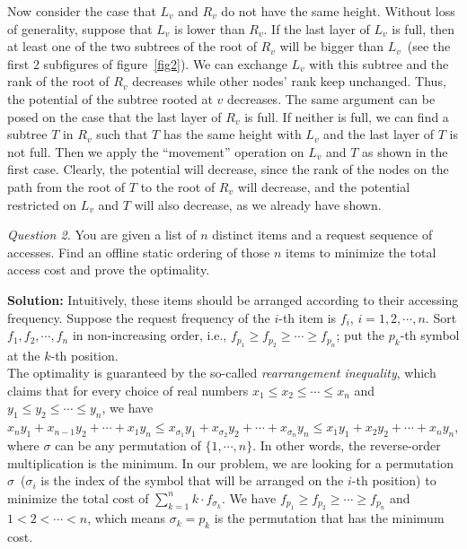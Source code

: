 \documentclass[11pt]{article}
\begin{document}
Now consider the case that $L_v$ and $R_v$ do not have the same height.
Without loss of generality, suppose that $L_v$ is lower than $R_v$.
If the last layer of $L_v$ is full, then 
at least one of the two subtrees of the root of $R_v$ will be 
bigger than $L_v$~(see the first 2 subfigures of figure~\ref{fig2}).
We can exchange $L_v$ with this subtree and the rank of the root of $R_v$ decreases while other nodes' rank keep unchanged.
Thus, the potential of the subtree rooted at $v$ decreases.
The same argument can be posed on the case that the last layer of $R_v$ is full.
If neither is full, we can find a subtree $T$ in $R_v$ such that $T$ has the same height with $L_v$ and
the last layer of $T$ is not full. Then we apply the ``movement'' operation on $L_v$ and $T$ as shown in the first case.
Clearly, the potential will decrease, since the rank of the nodes on the path from the root of $T$ to the root of $R_v$ will decrease, and the potential restricted on $L_v$ and $T$ will also decrease, as we already have shown.

\bigskip\rm\noindent
\emph{Question 2.}
You are given a list of $n$ distinct items and a request sequence of accesses.
Find an offline static ordering of those $n$ items to minimize the total access cost and prove the optimality.

\noindent
{\bf Solution:}
Intuitively, these items should be arranged according to their accessing frequency.
Suppose the request frequency of the $i$-th item is $f_i$, $i=1,2,\cdots, n$.
Sort $f_1, f_2, \cdots, f_n$ in non-increasing order,
i.e., $f_{p_1} \ge f_{p_2} \ge \cdots \ge f_{p_n}$;
put the $p_k$-th symbol at the $k$-th position.\\
The optimality is guaranteed by the so-called \emph{rearrangement inequality},
which claims that for every choice of real numbers
$x_1\le x_2 \le \cdots \le x_n$ and $y_1\le y_2 \le \cdots \le y_n$,
we have $x_ny_1 + x_{n-1}y_2 + \cdots + x_1y_n \le
x_{\sigma_1} y_1 + x_{\sigma_2} y_2 + \cdots + x_{\sigma_n} y_n  \le
x_1y_1 + x_2y_2 + \cdots + x_ny_n$, where $\sigma$ can be any permutation of $\{1,\cdots,n\}$.
In other words, the reverse-order multiplication is the minimum.
In our problem, we are looking for a permutation $\sigma$~($\sigma_i$ is the index of the symbol that will be
arranged on the $i$-th position)
to minimize the total cost of $\sum_{k=1}^n k\cdot f_{\sigma_k}$.
We have $f_{p_1} \ge f_{p_2} \ge \cdots \ge f_{p_n}$
and $1 < 2 < \cdots < n$,
which means $\sigma_k=p_k$ is the permutation that has the minimum cost.
\end{document}
